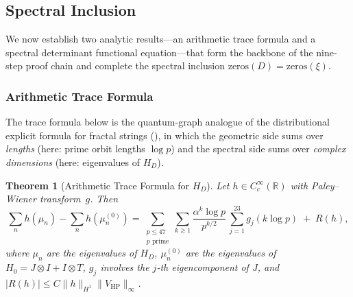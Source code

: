 \documentclass[11pt,a4paper]{article}
\theoremstyle{plain}
\newtheorem{theorem}{Theorem}[section]
\theoremstyle{remark}
\newcommand{\R}{\mathbb{R}}
\newcommand{\norm}[1]{\lVert #1 \rVert}
\begin{document}
\subsection{Spectral Inclusion}
\label{sec:toward-inclusion}

We now establish two analytic results---an arithmetic trace formula
and a spectral determinant functional equation---that form the
backbone of the nine-step proof chain and complete the spectral
inclusion $\mathrm{zeros}(D)=\mathrm{zeros}(\xi)$.

\subsubsection{Arithmetic Trace Formula}
\label{sec:trace-formula}

The trace formula below is the quantum-graph analogue of the
distributional explicit formula for fractal strings
(\cite{lapidus-maier1995,lapidus-vf2013}), in which the geometric side
sums over \emph{lengths} (here: prime orbit lengths $\log p$) and the
spectral side sums over \emph{complex dimensions} (here: eigenvalues of
$H_D$).

\begin{theorem}[Arithmetic Trace Formula for $H_D$]\label{thm:trace-formula}
Let $h\in C_c^\infty(\R)$ with Paley--Wiener transform~$g$.  Then
\begin{equation}\label{eq:trace-formula}
  \sum_n h(\mu_n) - \sum_n h(\mu_n^{(0)})
  = \sum_{\substack{p\leq 47\\p\text{ prime}}} \sum_{k\geq 1}
    \frac{\alpha^k\log p}{p^{k/2}}\,
    \sum_{j=1}^{23} g_j(k\log p)
  \;+\; R(h),
\end{equation}
where $\mu_n$ are the eigenvalues of $H_D$, $\mu_n^{(0)}$ are the
eigenvalues of $H_0=J\otimes I+I\otimes T$, $g_j$ involves the $j$-th
eigencomponent of $J$, and $|R(h)|\leq C\norm{h}_{H^1}\norm{V_{\mathrm{HP}}}_\infty$.
\end{theorem}
\end{document}
